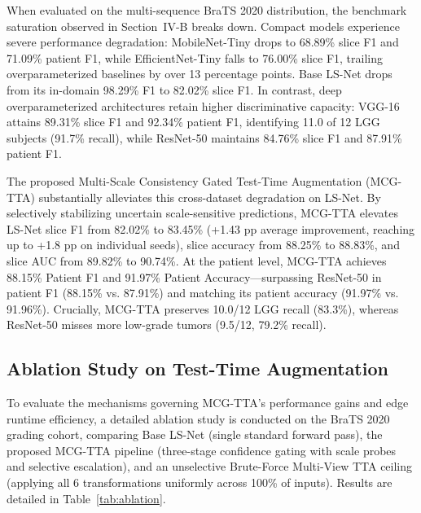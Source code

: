 When evaluated on the multi-sequence BraTS 2020 distribution, the benchmark saturation observed in Section~IV-B breaks down. Compact models experience severe performance degradation: MobileNet-Tiny drops to 68.89\% slice F1 and 71.09\% patient F1, while EfficientNet-Tiny falls to 76.00\% slice F1, trailing overparameterized baselines by over 13 percentage points. Base LS-Net drops from its in-domain 98.29\% F1 to 82.02\% slice F1. In contrast, deep overparameterized architectures retain higher discriminative capacity: VGG-16 attains 89.31\% slice F1 and 92.34\% patient F1, identifying 11.0 of 12 LGG subjects (91.7\% recall), while ResNet-50 maintains 84.76\% slice F1 and 87.91\% patient F1.

The proposed Multi-Scale Consistency Gated Test-Time Augmentation (MCG-TTA) substantially alleviates this cross-dataset degradation on LS-Net. By selectively stabilizing uncertain scale-sensitive predictions, MCG-TTA elevates LS-Net slice F1 from 82.02\% to 83.45\% (+1.43 pp average improvement, reaching up to +1.8 pp on individual seeds), slice accuracy from 88.25\% to 88.83\%, and slice AUC from 89.82\% to 90.74\%. At the patient level, MCG-TTA achieves 88.15\% Patient F1 and 91.97\% Patient Accuracy---surpassing ResNet-50 in patient F1 (88.15\% vs. 87.91\%) and matching its patient accuracy (91.97\% vs. 91.96\%). Crucially, MCG-TTA preserves 10.0/12 LGG recall (83.3\%), whereas ResNet-50 misses more low-grade tumors (9.5/12, 79.2\% recall).

\subsection{Ablation Study on Test-Time Augmentation}

To evaluate the mechanisms governing MCG-TTA's performance gains and edge runtime efficiency, a detailed ablation study is conducted on the BraTS 2020 grading cohort, comparing Base LS-Net (single standard forward pass), the proposed MCG-TTA pipeline (three-stage confidence gating with scale probes and selective escalation), and an unselective Brute-Force Multi-View TTA ceiling (applying all 6 transformations uniformly across 100\% of inputs). Results are detailed in Table~\ref{tab:ablation}.

